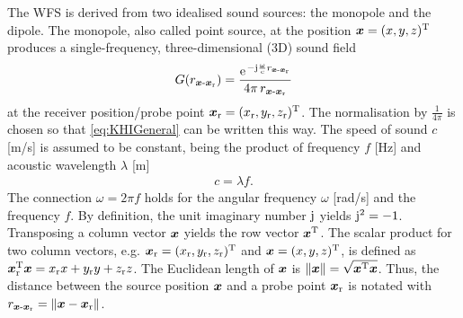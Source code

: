 The WFS is derived from two idealised sound sources:
the monopole and the dipole.
%
The monopole, also called point source, at the position $\bm{x}=(x,y,z)^\mathrm{T}$
produces a single-frequency, three-dimensional (3D) sound field
%
\begin{align}
\label{eq:G03D}
G(r_{\xs\text{-}\xr}) =
\frac{\e^{-\im\wc r_{\xs\text{-}\xr}}}{4\pi \, r_{\xs\text{-}\xr}}
\end{align}
%
at the receiver position/probe point
$\bm{x}_\mathrm{r}=(x_\mathrm{r},y_\mathrm{r},z_\mathrm{r})^\mathrm{T}$.
%
The normalisation by $\frac{1}{4 \pi}$ is chosen so that
\myeq\eqref{eq:KHIGeneral} can be written this way.
%
The speed of sound $c$ [m/s] is assumed to be constant, being the product of
frequency $f$ [Hz] and acoustic wavelength $\lambda$ [m]
\begin{align}
c = \lambda f.
\end{align}
The connection $\omega = 2 \pi f$
holds for the angular frequency $\omega$ [rad/s] and the frequency $f$.
%
By definition, the unit imaginary number $\im$ yields $\im^2=-1$.
%
Transposing a column vector $\bm{x}$ yields the row vector $\bm{x}^\mathrm{T}$.
%
The scalar product for two column vectors, e.g.
$\bm{x}_\mathrm{r}=(x_\mathrm{r},y_\mathrm{r},z_\mathrm{r})^\mathrm{T}$ and
$\bm{x}=(x,y,z)^\mathrm{T}$, is defined as
$\bm{x}_\mathrm{r}^\mathrm{T} \bm{x}=x_\mathrm{r} x + y_\mathrm{r} y + z_\mathrm{r} z$.
%
The Euclidean length of $\bm{x}$ is $\|\bm{x}\|=\sqrt{\bm{x}^\mathrm{T} \bm{x}}$.
%
Thus, the distance between the source position $\bm{x}$ and a probe point $\bm{x}_\mathrm{r}$ is
notated with $r_{\bm{x}\text{-}\bm{x}_\mathrm{r}}=\|\bm{x}-\bm{x}_\mathrm{r}\|$.

